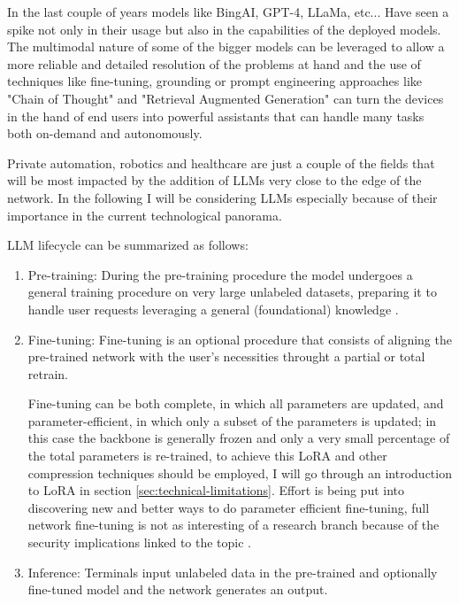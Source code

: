 In the last couple of years models like BingAI, GPT-4, LLaMa, etc... Have seen a spike not only in
their usage but also in the capabilities of the deployed models. The multimodal
nature of some of the bigger models can be leveraged to allow a more reliable and detailed
resolution of the problems at hand and the use of techniques like fine-tuning, grounding or prompt
engineering approaches like "Chain of Thought" and "Retrieval Augmented Generation" can turn the devices in the hand of end users into
powerful assistants that can handle many tasks both on-demand and autonomously.

Private automation, robotics and healthcare are just a couple of the fields that will be most
impacted by the addition of LLMs very close to the edge of the network. In the following I will be
considering LLMs especially because of their importance in the current technological panorama.

\bigskip

LLM lifecycle can be summarized as follows:
\begin{enumerate}
	\item Pre-training: During the pre-training procedure the model undergoes a general training
	      procedure on very large unlabeled datasets, preparing it to handle user requests
	      leveraging a general (foundational) knowledge \cite{gaisnet}.
	\item Fine-tuning: Fine-tuning is an optional procedure that consists of aligning the
	      pre-trained network with the user's necessities throught a partial or total retrain.

	      Fine-tuning can be both complete, in which all parameters are updated,
	      and parameter-efficient, in which only a subset of the parameters is updated; in this case
	      the backbone is generally frozen and only a very small percentage of the total
	      parameters is re-trained, to achieve this LoRA and other compression techniques should be employed, I will go through an introduction to LoRA in section \ref{sec:technical-limitations}. Effort is being put into discovering new and better ways to do parameter efficient fine-tuning, full network fine-tuning is not as interesting of a research branch because of the security implications linked to the topic \cite{gaisnet}.

	\item Inference: Terminals input unlabeled data in the pre-trained and optionally fine-tuned model and
	      the network generates an output.
\end{enumerate}


